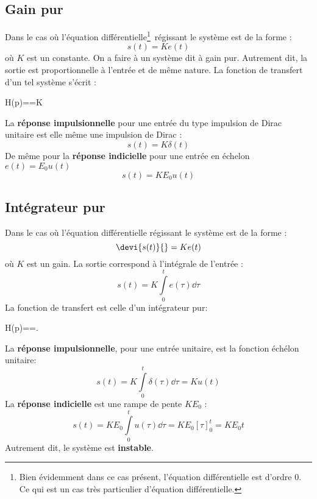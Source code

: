 \subsection{Gain pur}
Dans le cas où l'équation différentielle\footnote{Bien évidemment 
dans ce cas présent, l'équation différentielle est d'ordre 0. Ce qui est 
un cas très particulier d'équation différentielle.}~régissant le système 
est de la forme :
$$
s(t)=Ke(t)
$$
où $K$ est un constante. On a faire à un système dit à gain pur. 
Autrement dit, la sortie est proportionnelle à l'entrée et de même nature.
La fonction de transfert d'un tel système s'écrit :
\begin{bequation}
H(p)==K
\end{bequation}
La \textbf{réponse impulsionnelle} pour une entrée du type impulsion de 
Dirac unitaire est elle même une impulsion de Dirac :
$$
s(t)=K\delta(t)
$$
De même pour la \textbf{réponse indicielle} pour une entrée en 
échelon $e(t)=E_0u(t)$
$$
s(t)=KE_0u(t)
$$

\subsection{Intégrateur pur}
Dans le cas où l'équation différentielle régissant le système est de la forme :
$$
\devi{s(t)}{}=Ke(t)
$$
où $K$ est un gain. La sortie correspond à l'intégrale de l'entrée :
$$
s(t)=K\int\limits_0^t e(\tau)\dd{\tau}
$$
La fonction de transfert est celle d'un intégrateur pur:
\begin{bequation}
H(p)==.
\end{bequation}

La \textbf{réponse impulsionnelle}, pour une entrée unitaire, est la 
fonction échélon unitaire:
$$
s(t)=K\int\limits_0^t \delta(\tau)\dd{\tau}=Ku(t)
$$
La  \textbf{réponse indicielle} est une rampe de pente $KE_0$ :
$$
s(t)=KE_0\int\limits_0^t u(\tau)\dd{\tau}=KE_0\left[\tau\right]_0^t=KE_0t
$$
Autrement dit, le système est \textbf{instable}.

